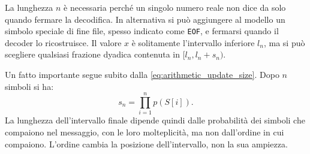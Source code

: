 \documentclass{article}
\theoremstyle{definition}
\numberwithin{equation}{section}
\begin{document}
La lunghezza $n$ è necessaria perché un singolo numero reale non dice da solo quando fermare la decodifica. In alternativa si può aggiungere al modello un simbolo speciale di fine file, spesso indicato come \texttt{EOF}, e fermarsi quando il decoder lo ricostruisce. Il valore $x$ è solitamente l'intervallo inferiore $l_n$, ma si può scegliere qualsiasi frazione dyadica contenuta in $[l_n,l_n+s_n)$.

Un fatto importante segue subito dalla \eqref{eq:arithmetic_update_size}. Dopo $n$ simboli si ha:
\begin{equation}\label{eq:arithmetic_final_size}
    s_n
    =
    \prod_{i=1}^{n} p(S[i]).
\end{equation}
La lunghezza dell'intervallo finale dipende quindi dalle probabilità dei simboli che compaiono nel messaggio, con le loro molteplicità, ma non dall'ordine in cui compaiono. L'ordine cambia la posizione dell'intervallo, non la sua ampiezza.
\end{document}
